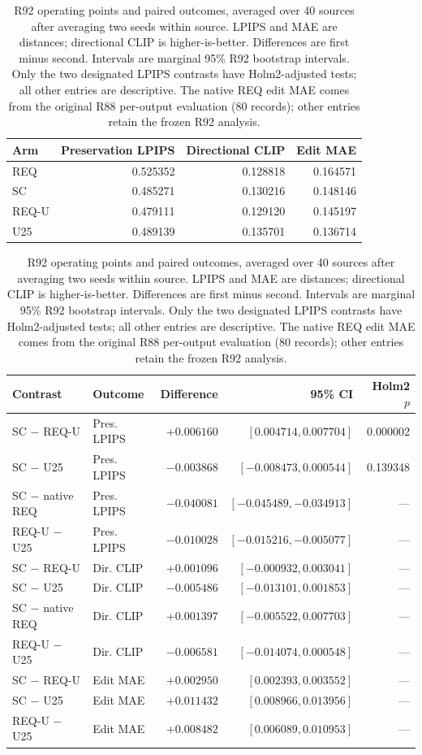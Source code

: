 \begin{table}[!t]
\centering\small
\caption{R92 operating points and paired outcomes, averaged over 40 sources after averaging two seeds within source. LPIPS and MAE are distances; directional CLIP is higher-is-better. Differences are first minus second. Intervals are marginal 95\% R92 bootstrap intervals. Only the two designated LPIPS contrasts have Holm2-adjusted tests; all other entries are descriptive. The native REQ edit MAE comes from the original R88 per-output evaluation (80 records); other entries retain the frozen R92 analysis.}
\label{tab:r92-results}
\begin{tabular}{lrrr}
\toprule
Arm & Preservation LPIPS & Directional CLIP & Edit MAE\\
\midrule
REQ & 0.525352 & 0.128818 & 0.164571\\
SC & 0.485271 & 0.130216 & 0.148146\\
REQ-U & 0.479111 & 0.129120 & 0.145197\\
U25 & 0.489139 & 0.135701 & 0.136714\\
\bottomrule
\end{tabular}
\par\medskip
\begin{tabular}{llrrr}
\toprule
Contrast & Outcome & Difference & 95\% CI & Holm2 $p$\\
\midrule
SC $-$ REQ-U & Pres. LPIPS & $+0.006160$ & $[0.004714,0.007704]$ & 0.000002\\
SC $-$ U25 & Pres. LPIPS & $-0.003868$ & $[-0.008473,0.000544]$ & 0.139348\\
SC $-$ native REQ & Pres. LPIPS & $-0.040081$ & $[-0.045489,-0.034913]$ & ---\\
REQ-U $-$ U25 & Pres. LPIPS & $-0.010028$ & $[-0.015216,-0.005077]$ & ---\\
SC $-$ REQ-U & Dir. CLIP & $+0.001096$ & $[-0.000932,0.003041]$ & ---\\
SC $-$ U25 & Dir. CLIP & $-0.005486$ & $[-0.013101,0.001853]$ & ---\\
SC $-$ native REQ & Dir. CLIP & $+0.001397$ & $[-0.005522,0.007703]$ & ---\\
REQ-U $-$ U25 & Dir. CLIP & $-0.006581$ & $[-0.014074,0.000548]$ & ---\\
SC $-$ REQ-U & Edit MAE & $+0.002950$ & $[0.002393,0.003552]$ & ---\\
SC $-$ U25 & Edit MAE & $+0.011432$ & $[0.008966,0.013956]$ & ---\\
REQ-U $-$ U25 & Edit MAE & $+0.008482$ & $[0.006089,0.010953]$ & ---\\
\bottomrule
\end{tabular}
\end{table}
